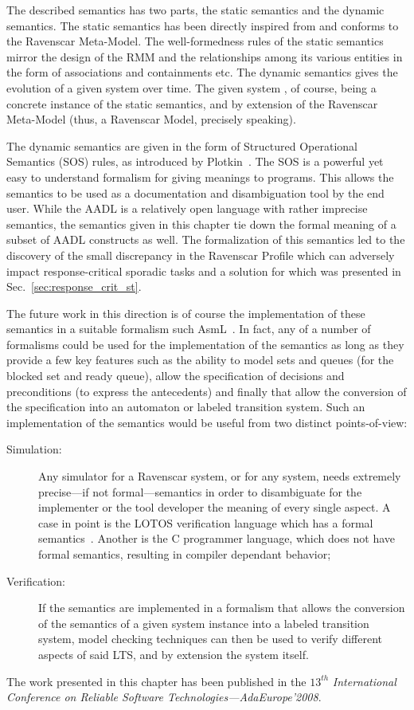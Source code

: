 The described semantics has two parts, the static semantics and the
dynamic semantics. The static semantics has been directly inspired
from and conforms to the Ravenscar Meta-Model. The well-formedness
rules of the static semantics mirror the design of the RMM and the
relationships among its various entities in the form of associations
and containments etc. The dynamic semantics gives the evolution of a
given system over time. The given system , of course, being a concrete
instance of the static semantics, and by extension of the Ravenscar
Meta-Model (thus, a Ravenscar Model, precisely speaking).

The dynamic semantics are given in the form of Structured Operational
Semantics (SOS) rules, as introduced by
Plotkin~\cite{plotkin-sos}. The SOS is a powerful yet easy to
understand formalism for giving meanings to programs. This allows the
semantics to be used as a documentation and disambiguation tool by the
end user. While the AADL is a relatively open language with rather
imprecise semantics, the semantics given in this chapter tie down the
formal meaning of a subset of AADL constructs as well. The
formalization of this semantics led to the discovery of the small
discrepancy in the Ravenscar Profile which can adversely impact
response-critical sporadic tasks and a solution for which was
presented in Sec.~\ref{sec:response_crit_st}.

The future work in this direction is of course the implementation of
these semantics in a suitable formalism such
AsmL~\cite{gurevich@tcs05}. In fact, any of a number of formalisms
could be used for the implementation of the semantics as long as they
provide a few key features such as the ability to model sets and
queues (for the blocked set and ready queue), allow the specification
of decisions and preconditions (to express the antecedents) and
finally that allow the conversion of the specification into an
automaton or labeled transition system. Such an implementation of the
semantics would be useful from two distinct points-of-view:

\begin{description}
\item[Simulation:]{Any simulator for a Ravenscar system, or for any
  system, needs extremely precise---if not formal---semantics in order
  to disambiguate for the implementer or the tool developer the
  meaning of every single aspect. A case in point is the LOTOS
  verification language which has a formal
  semantics~\cite{turner@pstv87}. Another is the C programmer
  language, which does not have formal semantics, resulting in
  compiler dependant behavior;}
\item[Verification:]{If the semantics are implemented in a formalism
  that allows the conversion of the semantics of a given system
  instance into a labeled transition system, model checking techniques
  can then be used to verify different aspects of said LTS, and by
  extension the system itself.}
\end{description}

The work presented in this chapter has been published in the $13^{th}$
\emph{International Conference on Reliable Software Technologies---AdaEurope'2008}. 


